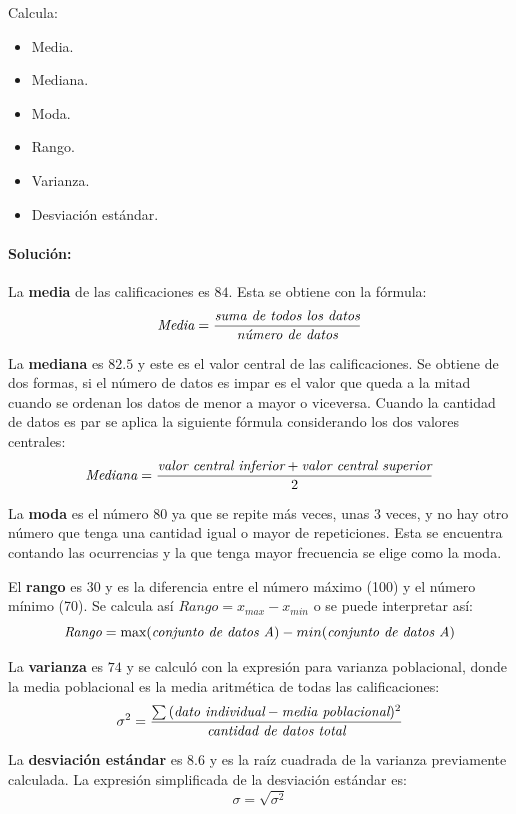 \documentclass[12pt]{article}
\begin{document}
Calcula:
\begin{itemize}
    \item Media.
    \item Mediana.
    \item Moda.
    \item Rango.
    \item Varianza.
    \item Desviación estándar.
\end{itemize}

\paragraph{\textbf{Solución: }}

La \textbf{media} de las calificaciones es $84$. Esta se obtiene con la fórmula:
\[\textit{Media} = {\textit{suma de todos los datos} \over \textit{número de datos}}\]

La \textbf{mediana} es $82.5$ y este es el valor central de las calificaciones. Se obtiene de dos formas, si el número de datos es impar es el valor que queda a la mitad cuando se ordenan los datos de menor a mayor o viceversa. Cuando la cantidad de datos es par se aplica la siguiente fórmula considerando los dos valores centrales:
\[\textit{Mediana} = {{{\textit{valor central inferior} + \textit{valor central superior}}} \over 2}\]

La \textbf{moda} es el número $80$ ya que se repite más veces, unas 3 veces, y no hay otro número que tenga una cantidad igual o mayor de repeticiones. Esta se encuentra contando las ocurrencias y la que tenga mayor frecuencia se elige como la moda.

El \textbf{rango} es $30$ y es la diferencia entre el número máximo (100) y el número mínimo (70). Se calcula así $\textit{Rango} = x_{max} - x_{min}$ o se puede interpretar así:
\[\textit{Rango} = \text{max(\textit{conjunto de datos A}}) - min(\textit{conjunto de datos A})\]

La \textbf{varianza} es $74$ y se calculó con la expresión para varianza poblacional, donde la media poblacional es la media aritmética de todas las calificaciones:
\[\sigma^2 = {\sum{(\textit{dato individual} - \textit{media poblacional})^2} \over \textit{cantidad de datos total}}\]

La \textbf{desviación estándar} es $8.6$ y es la raíz cuadrada de la varianza previamente calculada. La expresión simplificada de la desviación estándar es:
\[\sigma = \sqrt{\sigma^2}\]
\end{document}

